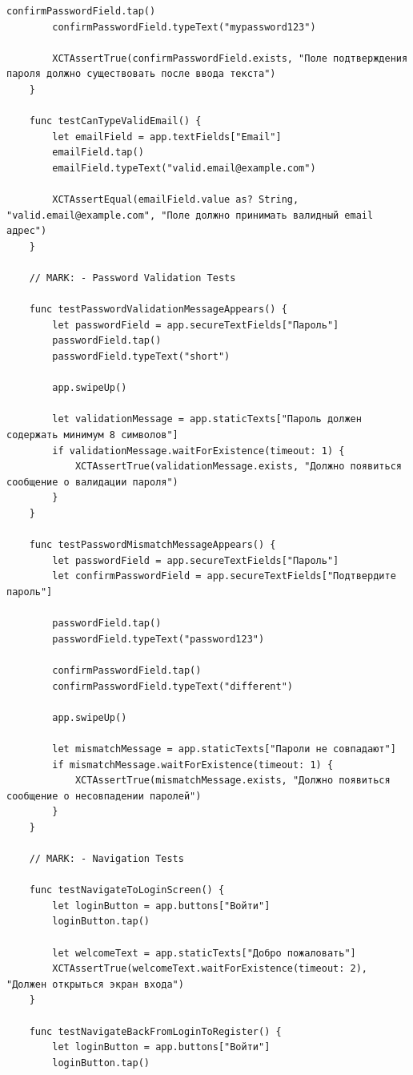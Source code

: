 \begin{lstlisting}[basicstyle=\tiny\ttfamily,breaklines=true]
        confirmPasswordField.tap()
        confirmPasswordField.typeText("mypassword123")

        XCTAssertTrue(confirmPasswordField.exists, "Поле подтверждения пароля должно существовать после ввода текста")
    }

    func testCanTypeValidEmail() {
        let emailField = app.textFields["Email"]
        emailField.tap()
        emailField.typeText("valid.email@example.com")

        XCTAssertEqual(emailField.value as? String, "valid.email@example.com", "Поле должно принимать валидный email адрес")
    }

    // MARK: - Password Validation Tests

    func testPasswordValidationMessageAppears() {
        let passwordField = app.secureTextFields["Пароль"]
        passwordField.tap()
        passwordField.typeText("short")

        app.swipeUp()

        let validationMessage = app.staticTexts["Пароль должен содержать минимум 8 символов"]
        if validationMessage.waitForExistence(timeout: 1) {
            XCTAssertTrue(validationMessage.exists, "Должно появиться сообщение о валидации пароля")
        }
    }

    func testPasswordMismatchMessageAppears() {
        let passwordField = app.secureTextFields["Пароль"]
        let confirmPasswordField = app.secureTextFields["Подтвердите пароль"]

        passwordField.tap()
        passwordField.typeText("password123")

        confirmPasswordField.tap()
        confirmPasswordField.typeText("different")

        app.swipeUp()

        let mismatchMessage = app.staticTexts["Пароли не совпадают"]
        if mismatchMessage.waitForExistence(timeout: 1) {
            XCTAssertTrue(mismatchMessage.exists, "Должно появиться сообщение о несовпадении паролей")
        }
    }

    // MARK: - Navigation Tests

    func testNavigateToLoginScreen() {
        let loginButton = app.buttons["Войти"]
        loginButton.tap()

        let welcomeText = app.staticTexts["Добро пожаловать"]
        XCTAssertTrue(welcomeText.waitForExistence(timeout: 2), "Должен открыться экран входа")
    }

    func testNavigateBackFromLoginToRegister() {
        let loginButton = app.buttons["Войти"]
        loginButton.tap()


\end{lstlisting}
